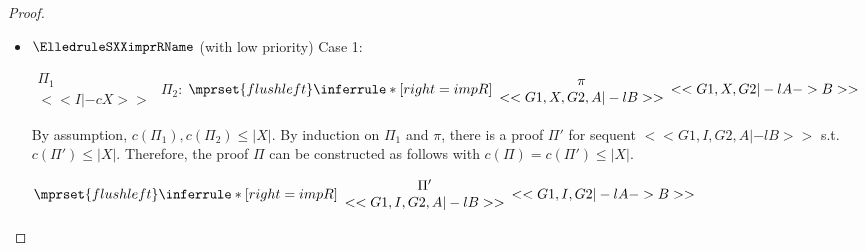 \begin{proof}
\begin{enumerate}
\begin{itemize}
  \item $\ElledruleSXXimprRName$ (with low priority) Case 1:
      \begin{center}
        \scriptsize
        \begin{math}
          \begin{array}{c}
            \Pi_1 \\
            {<<I |-c X>>}
          \end{array}
        \end{math}
        \qquad\qquad
        $\Pi_2$:
        \begin{math}
          $$\mprset{flushleft}
          \inferrule* [right={\tiny impR}] {
            {
              \begin{array}{c}
                \pi \\
                {<<G1, X, G2, A |-l B>>}
              \end{array}
            }
          }{<<G1, X, G2 |-l A -> B>>}
        \end{math}
      \end{center}
      By assumption, $c(\Pi_1),c(\Pi_2)\leq |X|$. By induction on $\Pi_1$ and $\pi$, there
      is a proof $\Pi'$ for sequent $<<G1, I, G2, A |-l B>>$ s.t. $c(\Pi') \leq |X|$.
      Therefore, the proof $\Pi$ can be constructed as follows with
      $c(\Pi) = c(\Pi') \leq |X|$.
      \begin{center}
        \scriptsize
        \begin{math}
          $$\mprset{flushleft}
          \inferrule* [right={\tiny impR}] {
            {
              \begin{array}{c}
                \Pi' \\
                {<<G1, I, G2, A |-l B>>}
              \end{array}
            }
          }{<<G1, I, G2 |-l A -> B>>}
        \end{math}
      \end{center}


\end{itemize}
\end{enumerate}
\end{proof}
